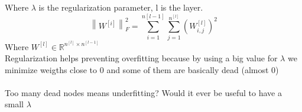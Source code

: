 \documentclass{article}
\newcommand{\norm}[1]{\left\lVert#1\right\rVert}
\begin{document}
Where $\lambda$ is the regularization parameter, l is the layer. $$\norm{W^{[i]}}^2_F=\sum_{i=1}^{n{[l-1]}}{\sum_{j=1}^{n^{[l]}}{(W_{i,j}^{[l]})^2}}$$
Where $W^{[l]}\in \mathbb{R}^{n^{[l]}\times n^{[l-1]}}$\\
Regularization helps preventing overfitting because by using a big value for $\lambda$ we minimize weigths close to 0 and some of them are basically dead (almost 0)\\\\
Too many dead nodes means underfitting? Would it ever be useful to have a small $\lambda$\\\\
\end{document}
